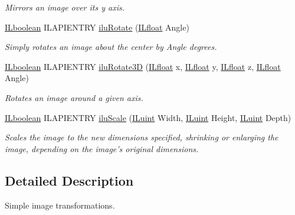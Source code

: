 \begin{DoxyCompactItemize}
\begin{DoxyCompactList}\small\item\em Mirrors an image over its y axis. \end{DoxyCompactList}\item 
\hyperlink{group__il__types_gaa6aa7c95cfdc06b4d8601ef832b7bb0a}{I\+Lboolean} I\+L\+A\+P\+I\+E\+N\+T\+R\+Y \hyperlink{group__ilu__geometry_gacc794d0e5a6951bb801fb9b278d63215}{ilu\+Rotate} (\hyperlink{group__il__types_ga376156c9461893f4b1a5de9579dc86f2}{I\+Lfloat} Angle)
\begin{DoxyCompactList}\small\item\em Simply rotates an image about the center by {\itshape Angle} degrees. \end{DoxyCompactList}\item 
\hyperlink{group__il__types_gaa6aa7c95cfdc06b4d8601ef832b7bb0a}{I\+Lboolean} I\+L\+A\+P\+I\+E\+N\+T\+R\+Y \hyperlink{group__ilu__geometry_gab62dd0f340a7f55455ab4c5a92747f2d}{ilu\+Rotate3\+D} (\hyperlink{group__il__types_ga376156c9461893f4b1a5de9579dc86f2}{I\+Lfloat} x, \hyperlink{group__il__types_ga376156c9461893f4b1a5de9579dc86f2}{I\+Lfloat} y, \hyperlink{group__il__types_ga376156c9461893f4b1a5de9579dc86f2}{I\+Lfloat} z, \hyperlink{group__il__types_ga376156c9461893f4b1a5de9579dc86f2}{I\+Lfloat} Angle)
\begin{DoxyCompactList}\small\item\em Rotates an image around a given axis. \end{DoxyCompactList}\item 
\hyperlink{group__il__types_gaa6aa7c95cfdc06b4d8601ef832b7bb0a}{I\+Lboolean} I\+L\+A\+P\+I\+E\+N\+T\+R\+Y \hyperlink{group__ilu__geometry_ga34b36ea94ddcbc730391534ffd497d1d}{ilu\+Scale} (\hyperlink{group__il__types_gaff8e86a1072c8d7cfe387fb87c6ed8e1}{I\+Luint} Width, \hyperlink{group__il__types_gaff8e86a1072c8d7cfe387fb87c6ed8e1}{I\+Luint} Height, \hyperlink{group__il__types_gaff8e86a1072c8d7cfe387fb87c6ed8e1}{I\+Luint} Depth)
\begin{DoxyCompactList}\small\item\em Scales the image to the new dimensions specified, shrinking or enlarging the image, depending on the image's original dimensions. \end{DoxyCompactList}\end{DoxyCompactItemize}


\subsection{Detailed Description}
Simple image transformations. 

